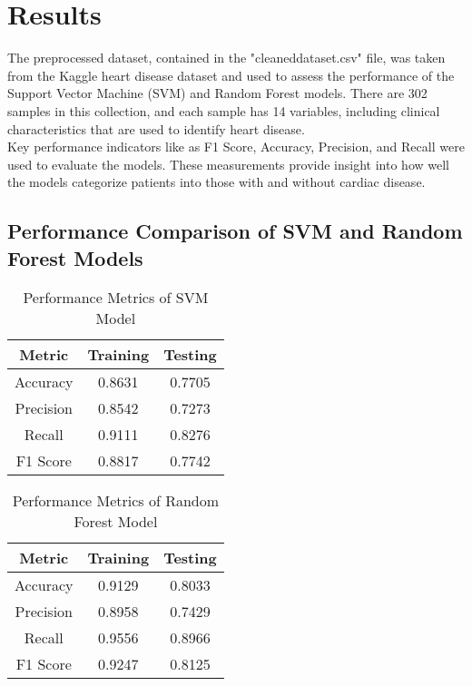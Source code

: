 \chapter{Results}
\label{ch:results}
The preprocessed dataset, contained in the "cleaneddataset.csv" file, was taken from the Kaggle heart disease dataset and used to assess the performance of the Support Vector Machine (SVM) and Random Forest models. There are 302 samples in this collection, and each sample has 14 variables, including clinical characteristics that are used to identify heart disease.
\\
Key performance indicators like as F1 Score, Accuracy, Precision, and Recall were used to evaluate the models. These measurements provide insight into how well the models categorize patients into those with and without cardiac disease. 
\\


\section{Performance Comparison of SVM and Random Forest Models}

\begin{table}[H]
    \centering
    \caption{Performance Metrics of SVM Model}
    \begin{tabular}{|c|c|c|}
    \hline
    \textbf{Metric} & \textbf{Training} & \textbf{Testing} \\ \hline
    Accuracy        & 0.8631            & 0.7705           \\ \hline
    Precision       & 0.8542            & 0.7273           \\ \hline
    Recall          & 0.9111            & 0.8276           \\ \hline
    F1 Score        & 0.8817            & 0.7742           \\ \hline
    \end{tabular}
\end{table}

\begin{table}[H]
    \centering
    \caption{Performance Metrics of Random Forest Model}
    \begin{tabular}{|c|c|c|}
    \hline
    \textbf{Metric} & \textbf{Training} & \textbf{Testing} \\ \hline
    Accuracy        & 0.9129            & 0.8033           \\ \hline
    Precision       & 0.8958            & 0.7429           \\ \hline
    Recall          & 0.9556            & 0.8966           \\ \hline
    F1 Score        & 0.9247            & 0.8125           \\ \hline
    \end{tabular}
\end{table}

